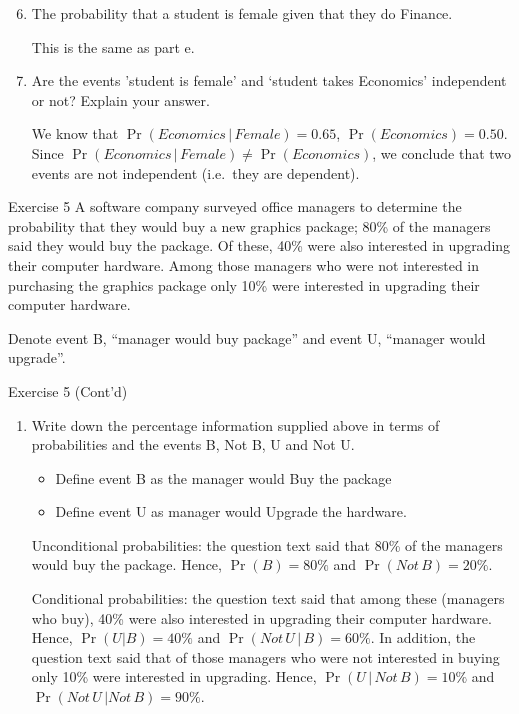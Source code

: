 \documentclass[
  ignorenonframetext,
  aspectratio=43,
]{beamer}
\let\olditem\item
\renewcommand\item{\olditem\justifying}
\begin{document}
\begin{frame}{}
\protect\hypertarget{section-2}{}
\begin{enumerate}
\setcounter{enumi}{5}
\item
  The probability that a student is female given that they do Finance.

  \pause

  This is the same as part e.
\item
  Are the events 'student is female' and `student takes Economics'
  independent or not? Explain your answer.

  \pause

  We know that
  \(\Pr(\textit{Economics}\, | \, \textit{Female}) = 0.65\),
  \(\Pr(\textit{Economics}) = 0.50\). Since
  \(\Pr(\textit{Economics}\, | \, \textit{Female}) \neq \Pr(\textit{Economics})\),
  we conclude that two events are not independent (i.e.~they are
  dependent).
\end{enumerate}
\end{frame}

\begin{frame}{Exercise 5}
\protect\hypertarget{exercise-5}{}
A software company surveyed office managers to determine the probability
that they would buy a new graphics package; 80\% of the managers said
they would buy the package. Of these, 40\% were also interested in
upgrading their computer hardware. Among those managers who were not
interested in purchasing the graphics package only 10\% were interested
in upgrading their computer hardware.

Denote event B, ``manager would buy package'' and event U, ``manager
would upgrade''.
\end{frame}

\begin{frame}{Exercise 5 (Cont'd)}
\protect\hypertarget{exercise-5-contd}{}
\begin{enumerate}
\item
  Write down the percentage information supplied above in terms of
  probabilities and the events B, Not B, U and Not U.

  \pause

  \begin{itemize}
  \item
    Define event B as the manager would Buy the package
  \item
    Define event U as manager would Upgrade the hardware.
  \end{itemize}

  Unconditional probabilities: the question text said that 80\% of the
  managers would buy the package. Hence, \(\Pr(B) = 80\%\) and
  \(\Pr(Not \, B) = 20\%\).

  Conditional probabilities: the question text said that among these
  (managers who buy), 40\% were also interested in upgrading their
  computer hardware. Hence, \(\Pr(U|B) = 40\%\) and
  \(\Pr(Not \, U \,| \,B)=60\%\). In addition, the question text said
  that of those managers who were not interested in buying only 10\%
  were interested in upgrading. Hence, \(\Pr(U \, | \, Not\, B)=10\%\)
  and \(\Pr(Not\, U \, |Not\, B)=90\%\).
\end{enumerate}
\end{frame}
\end{document}
